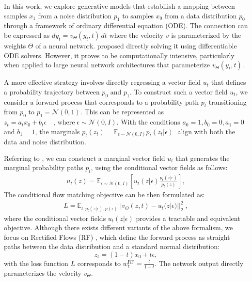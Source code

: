 In this work, we explore generative models that estabilish a mapping between samples $x_1$ from a noise distribution $p_1$ to samples $x_0$ from a data distribution $p_0$ through a framework of ordinary differential equation (ODE). 
The connection can be expressed as $dy_t = v_\Theta(y_t, t)\,dt $ where the velocity $v$ is parameterized by the weights $\Theta$ of a neural network. 
\cite{Chen2018NeuralOD} proposed directly solving it using differentiable ODE solvers. However, it proves to be computationally intensive, particularly when applied to large neural network architectures that parameterize $v_\Theta(y_t, t)$. 

A more effective strategy involves directly regressing a vector field $u_t$ that defines a probability trajectory between $p_0$ and $p_1$.
To construct such a vector field $u_t$, we consider a forward process that corresponds to a probability path $p_t$ transitioning from $p_0$ to $p_1=\mathcal{N}(0, 1)$. This can be represented as $z_t = a_t x_0 + b_t \epsilon\quad\text{, where}\;\epsilon \sim \mathcal{N}(0,I)$.
With the conditions $a_0 = 1, b_0 = 0, a_1 = 0$ and $b_1 = 1$, the marginals $p_t(z_t) =
  \mathbb{E}_{\epsilon \sim \mathcal{N}(0,I)}
  p_t(z_t \vert \epsilon)\;$ align with both the data and noise distribution.

Referring to \cite{lipman2023flow,esser2024scaling}, we can construct a marginal vector field $u_t$ that generates the marginal probability paths $p_t$, using the conditional vector fields as follows:
\begin{align}
    u_t(z) = \mathbb{E}_{\epsilon \sim
  \mathcal{N}(0,I)} [u_t(z \vert \epsilon) \frac{p_t(z \vert
  \epsilon)}{p_t(z)}],
  \label{eq:marginal_u}
\end{align}
The conditional flow matching objective can be then formulated as:
\begin{align}
   {L} =  \mathbb{E}_{t, p_t(z | \epsilon), p(\epsilon) }|| v_{\Theta}(z, t) - u_t(z | \epsilon)  ||_2^2\;, \label{eq:condflowmatch}
\end{align}
where the conditional vector fields $u_t(z \vert \epsilon)$ provides a tractable and equivalent objective. 
Although there exists different variants of the above formalism, we focus on Rectified Flows (RF) \cite{liu2022flow,albergo2022building,lipman2023flow}, which define the forward process as straight paths between the data distribution and a standard normal distribution: 
\begin{equation}
z_t = (1-t) x_0 + t \epsilon,
\end{equation}
with the loss function ${L}$ corresponds to $w_t^\text{RF} = \frac{t}{1-t}$. The network output directly parameterizes the velocity $v_\Theta$.

